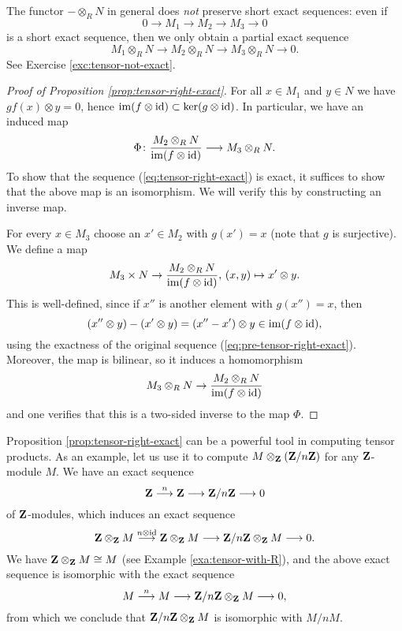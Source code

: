 The functor $-\otimes_R N$ in general does \emph{not} preserve short exact sequences: even if
\[
	0\to M_1 \to M_2 \to M_3 \to 0
\]
is a short exact sequence, then we only obtain a partial exact sequence
\[
	 M_1\otimes_R N \to M_2\otimes_R N \to M_3\otimes_R N \to 0.
\]
See Exercise \ref{exc:tensor-not-exact}.

\begin{proof}[Proof of Proposition \ref{prop:tensor-right-exact}]
For all $x\in M_1$ and $y\in N$ we have $gf(x)\otimes y=0$, hence $\operatorname{im} (f\otimes {\rm id}) \subset \ker (g\otimes {\rm id})$. In particular, we have an induced map
\begin{equation}\label{eq:tensor-exact-induced}
	\Phi\colon \frac{M_2\otimes_R N}{\operatorname{im} (f\otimes {\rm id})} \longrightarrow M_3 \otimes_R N.
\end{equation}
To show that the sequence (\ref{eq:tensor-right-exact}) is exact, it suffices to show that the above map is an isomorphism.  We will verify this by constructing an inverse map.

For every $x\in M_3$ choose an $x'\in M_2$ with $g(x')=x$ (note that $g$ is surjective). We define a map
\[
	  M_3 \times N \to \frac{M_2\otimes_R N}{\operatorname{im} (f\otimes {\rm id})},\,  (x,y) \mapsto x'\otimes y.
\]
This is well-defined, since if $x''$ is another element with $g(x'')=x$, then
\[
	(x''\otimes y) - (x'\otimes y) = (x''-x') \otimes y \in \operatorname{im} (f\otimes {\rm id}),
\]
using the exactness of the original sequence (\ref{eq:pre-tensor-right-exact}).
Moreover, the map is bilinear, so it induces a homomorphism 
\[
	M_3\otimes_R N \to \frac{M_2\otimes_R N}{\operatorname{im} (f\otimes {\rm id})}
\]
and one verifies that this is a two-sided inverse to the map $\Phi$.
\end{proof}

\begin{example}
Proposition \ref{prop:tensor-right-exact} can be a powerful tool in computing tensor products. As an example, let us use it to compute $M\otimes_{\mathbf{Z}} ({\mathbf{Z}}/n{\mathbf{Z}})$ for any ${\mathbf{Z}}$-module $M$. We have an exact sequence
\[
	{\mathbf{Z}} \overset{n}{\longrightarrow} {\mathbf{Z}} \longrightarrow {\mathbf{Z}}/n{\mathbf{Z}} \longrightarrow 0
\]
of ${\mathbf{Z}}$-modules, which induces an exact sequence
\[
	{\mathbf{Z}}\otimes_{\mathbf{Z}} M \overset{n\otimes {\rm id}}{\longrightarrow} {\mathbf{Z}} \otimes_{\mathbf{Z}} M
	 \longrightarrow {\mathbf{Z}}/n{\mathbf{Z}} \otimes_{\mathbf{Z}} M \longrightarrow 0.
\]
We have ${\mathbf{Z}}\otimes_{\mathbf{Z}} M \cong M$ (see Example \ref{exa:tensor-with-R}), and the above exact sequence is isomorphic with the exact sequence
\[
	M \overset{n}{\longrightarrow} M \longrightarrow {\mathbf{Z}}/n{\mathbf{Z}} \otimes_{\mathbf{Z}} M \longrightarrow 0,
\]
from which we conclude that ${\mathbf{Z}}/n{\mathbf{Z}} \otimes_{\mathbf{Z}} M$ is isomorphic with $M/nM$.
\end{example}



